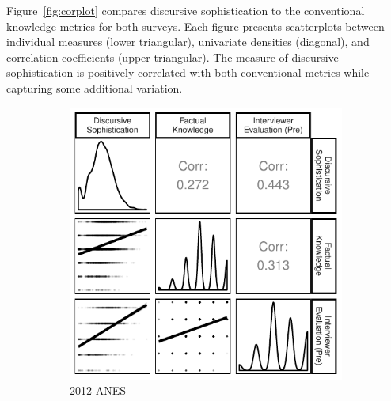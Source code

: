 \documentclass[12pt]{article}
\begin{document}

Figure~\ref{fig:corplot} compares discursive sophistication to the conventional knowledge metrics for both surveys. Each figure presents scatterplots between individual measures (lower triangular), univariate densities (diagonal), and correlation coefficients (upper triangular). The measure of discursive sophistication is positively correlated with both conventional metrics while capturing some additional variation.

\begin{figure}[h]
    \centering
    \begin{subfigure}[t]{0.5\textwidth}
        \centering
        \includegraphics{../fig/corplot_pres2012.pdf}
        \caption{2012 ANES}
    \end{subfigure}%
    ~ 
    \begin{subfigure}[t]{0.5\textwidth}
        \centering

\end{subfigure}
\end{figure}
\end{document}
